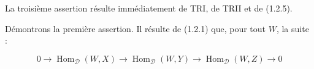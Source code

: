 La troisième assertion résulte immédiatement de TRI, de TRII et de (1.2.5).

Démontrons la première assertion. Il résulte de (1.2.1) que, pour tout $W$,
la suite :

\begin{equation}
  0\longrightarrow\operatorname{Hom}_{\mathcal D}(W,X)
  \longrightarrow\operatorname{Hom}_{\mathcal D}(W,Y)
  \longrightarrow\operatorname{Hom}_{\mathcal D}(W,Z)
  \longrightarrow0
  \tag{1.2.6.2}
\end{equation}
\endgroup
